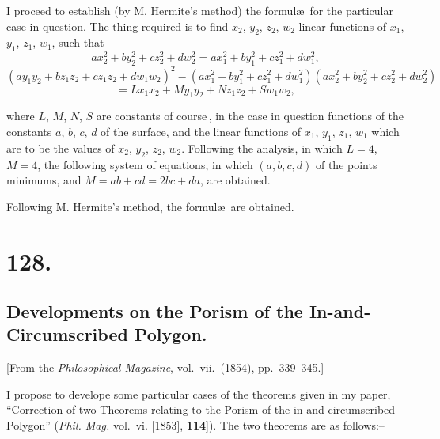 \documentclass[11pt,a4paper]{article}
\theoremstyle{definition}
\begin{document}
\medskip

I proceed to establish (by M. Hermite's method) the formul\ae\ for the particular
case in question. The thing required is to find $x_2$, $y_2$, $z_2$, $w_2$ linear functions of
$x_1$, $y_1$, $z_1$, $w_1$, such that
\[
ax_2^2 + by_2^2 + cz_2^2 + dw_2^2 = ax_1^2 + by_1^2 + cz_1^2 + dw_1^2,
\]
\[
(ay_1y_2 + bz_1z_2 + cz_1z_2 + dw_1w_2)^2 - (ax_1^2 + by_1^2 + cz_1^2 + dw_1^2)(ax_2^2+by_2^2+cz_2^2+dw_2^2)
\]
\[
= L x_1 x_2 + M y_1 y_2 + N z_1 z_2 + S w_1 w_2,
\]

\noindent where $L$, $M$, $N$, $S$ are constants of course\,, in the case in question functions of
the constants $a$, $b$, $c$, $d$ of the surface, and the linear functions of $x_1$, $y_1$, $z_1$, $w_1$ which
are to be the values of $x_2$, $y_2$, $z_2$, $w_2$. Following the analysis, in which $L=4$, $M=4$,
the following system of equations, in which $(a, b, c, d)$ of the points minimums, and $M=ab+cd=2bc+da$, are obtained.

\medskip

Following M. Hermite's method, the formul\ae\ are obtained.

\section*{128.}
\subsection*{Developments on the Porism of the In-and-Circumscribed Polygon.}

[From the \textit{Philosophical Magazine}, vol.\ vii.\ (1854), pp.\ 339--345.]

\medskip

I propose to develope some particular cases of the theorems given in my paper,
``Correction of two Theorems relating to the Porism of the in-and-circumscribed
Polygon'' (\textit{Phil. Mag.} vol.\ vi. [1853], \textbf{114}]). The two theorems are as follows:--

\medskip
\end{document}

